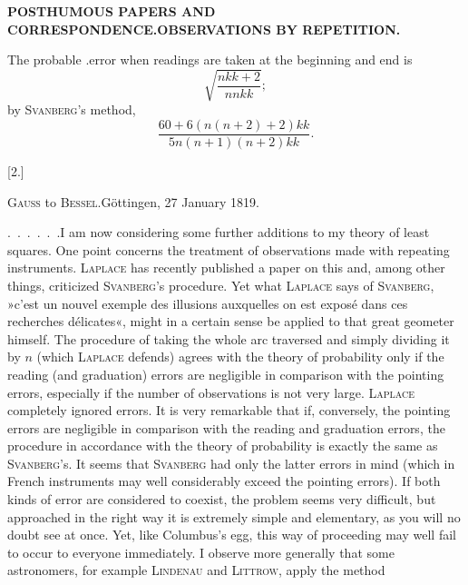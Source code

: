\par\clearpage
\noindent\null\hfill{\fontsize{8.2}{10}\selectfont\textbf{POSTHUMOUS PAPERS AND CORRESPONDENCE.\quad OBSERVATIONS BY REPETITION.}}\hfill{}\par\medskip
\par\noindent\hspace*{\parindent}The probable .error when readings are taken  at the beginning and end is
\[
\sqrt{\frac{nkk+2}{nnkk}};
\]
\noindent by \textsc{Svanberg}'s method,
\[
\frac{60+6(n(n+2)+2)kk}{5n(n+1)(n+2)kk}.
\]
\begin{center}\vspace{.7cm}[2.]\par\bigskip
{\large\textsc{Gauss} to \textsc{Bessel}.\quad Göttingen, 27 January 1819.}\end{center}
\par\noindent\hspace*{\parindent}.\ .\ .\ .\ .\ .\enspace I am now considering some further additions to my theory of least squares. One point concerns the treatment of observations made with repeating instruments. \textsc{Laplace} has recently published a paper on this and, among other things, criticized \textsc{Svanberg}'s procedure. Yet what \textsc{Laplace} says of \textsc{Svanberg}, »c’est un nouvel exemple des illusions auxquelles on est exposé dans ces recherches délicates«, might in a certain sense be applied to that great geometer himself. The procedure of taking the whole arc traversed and simply dividing it by $n$ (which \textsc{Laplace} defends) agrees with the theory of probability only if the reading (and graduation) errors are negligible in comparison with the pointing errors, especially if the number of observations is not very large. \textsc{Laplace} completely ignored  errors. It is very remarkable that if, conversely, the pointing errors are negligible in comparison with the reading and graduation errors, the procedure in accordance with the theory of probability is exactly the same as \textsc{Svanberg}'s. It seems that \textsc{Svanberg} had only the latter errors in mind (which in French instruments may well considerably exceed the pointing errors). If both kinds of error are considered to coexist, the problem seems very difficult, but approached in the right way it is extremely simple and elementary, as you will no doubt see at once. Yet, like Columbus's egg, this way of proceeding may well fail to occur to everyone immediately. I observe more generally that some astronomers, for example \textsc{Lindenau} and \textsc{Littrow}, apply the method
\par\medskip\noindent\makebox[.86\linewidth][r]{65\textsuperscript{*}}\par

